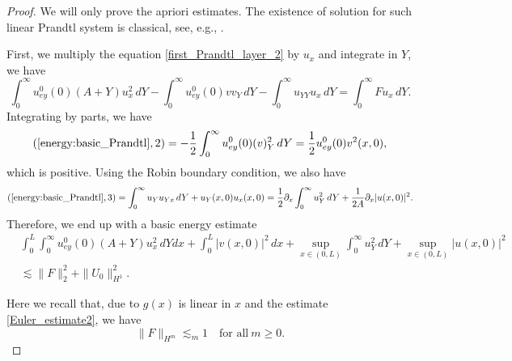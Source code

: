 \documentclass[reqno, 11pt]{amsart}
\theoremstyle{plain}
\theoremstyle{definition}
\theoremstyle{remark}
\numberwithin{equation}{section}
\begin{document}
\begin{proof}
We will only prove the apriori estimates. The existence of solution for such linear Prandtl system is classical, see, e.g., \cite{GuoIyer21}.

First, we multiply the equation \eqref{first_Prandtl_layer_2} by $u_x$ and integrate in $Y$, we have
\begin{equation}\label{energy:basic_Prandtl}
\int_0^\infty  u_{ey}^0(0) (A+Y) u_x^2 \, dY - \int_0^\infty  u_{ey}^0(0) v v_Y \, dY - \int_0^\infty  u_{YY} u_x \, dY = \int_0^\infty  F u_x \,dY.
\end{equation}
Integrating by parts, we have
$$
(\ref{energy:basic_Prandtl},2) =  - \frac{1}{2} \int_0^\infty  u_{ey}^0(0) (v)^2_Y \, dY = \frac{1}{2} u_{ey}^0(0)v^2(x,0),
$$
which is positive. Using the Robin boundary condition, we also have
\begin{align*}
(\ref{energy:basic_Prandtl},3) = \int_0^\infty  u_Y u_{Yx} \, dY + u_Y(x,0) u_x(x,0)= \frac{1}{2} \partial_x \int_0^\infty  u_Y^2 \, dY + \frac{1}{2A} \partial_x |u(x,0)|^2.
\end{align*}
Therefore, we end up with a basic energy estimate
\begin{equation}\label{est:basic_Prandtl}
\begin{aligned}
&\int_0^L \int_0^\infty  u_{ey}^0(0) (A+Y) u_x^2 \, dY dx + \int_0^L |v(x,0)|^2\, dx + \sup_{x\in(0,L)} \int_0^\infty  u_Y^2 \, dY + \sup_{x\in(0,L)} |u(x,0)|^2\\
& \lesssim \|F\|_2^2 + \|U_0\|_{H^1}^2.
\end{aligned}
\end{equation}

Here we recall that, due to $g(x)$ is linear in $x$ and the estimate \eqref{Euler_estimate2}, we have
$$
\|F\|_{H^m} \lesssim_m 1 \quad \mbox{for all}~m \geq 0.
$$


\end{proof}
\end{document}
